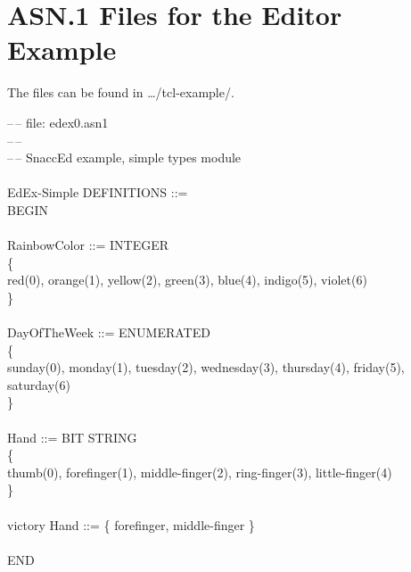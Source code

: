 \chapter{\label{edex-files}ASN.1 Files for the Editor Example}

The files can be found in {\ufn \dots/tcl-example/}.

\begin{ASNcode}
\label{edex0.asn1}%
--\,-- file: edex0.asn1\\
--\,--\\
--\,-- SnaccEd example, simple types module\\
\\
EdEx-Simple DEFINITIONS ::=\\
BEGIN\\
\\
RainbowColor ::= INTEGER\\
\{\\
  \>red(0), orange(1), yellow(2), green(3), blue(4), indigo(5), violet(6)\\
\}\\
\\
DayOfTheWeek ::= ENUMERATED\\
\{\\
  \>sunday(0), monday(1), tuesday(2), wednesday(3), thursday(4), friday(5), saturday(6)\\
\}\\
\\
Hand ::= BIT STRING\\
\{\\
  \>thumb(0), forefinger(1), middle-finger(2), ring-finger(3), little-finger(4)\\
\}\\
\\
victory Hand ::= \{ forefinger, middle-finger \}\\
\\
END
\end{ASNcode}

